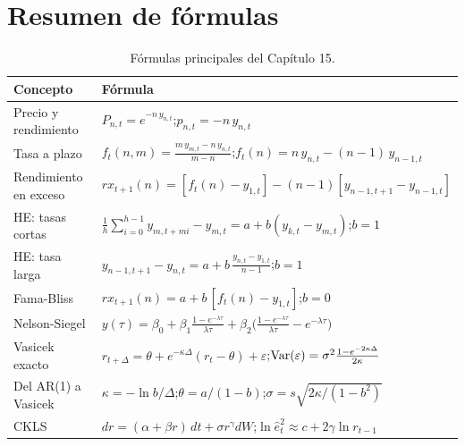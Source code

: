\section{Resumen de fórmulas}

\begin{table}[H]
\centering\small
\begin{tabular}{@{}ll@{}}
\toprule
Concepto & Fórmula \\
\midrule
Precio y rendimiento & $P_{n,t}=e^{-n\,y_{n,t}}$;\quad $p_{n,t}=-n\,y_{n,t}$ \\
Tasa a plazo & $f_t(n,m)=\frac{m\,y_{m,t}-n\,y_{n,t}}{m-n}$;\quad $f_t(n)=n\,y_{n,t}-(n-1)\,y_{n-1,t}$ \\
Rendimiento en exceso & $rx_{t+1}(n)=[f_t(n)-y_{1,t}]-(n-1)[y_{n-1,t+1}-y_{n-1,t}]$ \\
HE: tasas cortas & $\frac1h\sum_{i=0}^{h-1}y_{m,t+mi}-y_{m,t}=a+b(y_{k,t}-y_{m,t})$;\quad $b=1$ \\
HE: tasa larga & $y_{n-1,t+1}-y_{n,t}=a+b\,\frac{y_{n,t}-y_{1,t}}{n-1}$;\quad $b=1$ \\
Fama-Bliss & $rx_{t+1}(n)=a+b\,[f_t(n)-y_{1,t}]$;\quad $b=0$ \\
Nelson-Siegel & $y(\tau)=\beta_0+\beta_1\frac{1-e^{-\lambda\tau}}{\lambda\tau}+\beta_2\bigl(\frac{1-e^{-\lambda\tau}}{\lambda\tau}-e^{-\lambda\tau}\bigr)$ \\
Vasicek exacto & $r_{t+\Delta}=\theta+e^{-\kappa\Delta}(r_t-\theta)+\varepsilon$;\quad $\operatorname{Var}(\varepsilon)=\sigma^2\frac{1-e^{-2\kappa\Delta}}{2\kappa}$ \\
Del AR(1) a Vasicek & $\kappa=-\ln b/\Delta$;\quad $\theta=a/(1-b)$;\quad $\sigma=s\sqrt{2\kappa/(1-b^2)}$ \\
CKLS & $dr=(\alpha+\beta r)\,dt+\sigma r^{\gamma}dW$;\quad $\ln\hat e^2_t\approx c+2\gamma\ln r_{t-1}$ \\
\bottomrule
\end{tabular}
\caption{Fórmulas principales del Capítulo 15.}
\end{table}

